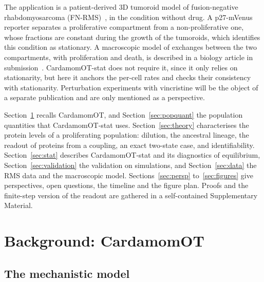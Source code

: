 \documentclass[a4paper, 11pt]{article}
\theoremstyle{plain}
\theoremstyle{remark}
\begin{document}
The application is a patient-derived 3D tumoroid model of fusion-negative rhabdomyosarcoma (FN-RMS)~\cite{savary2023fnrms}, in the condition without drug. A p27-mVenus reporter separates a proliferative compartment from a non-proliferative one, whose fractions are constant during the growth of the tumoroids, which identifies this condition as stationary. A macroscopic model of exchanges between the two compartments, with proliferation and death, is described in a biology article in submission~\cite{rmsbio}. CardamomOT-stat does not require it, since it only relies on stationarity, but here it anchors the per-cell rates and checks their consistency with stationarity. Perturbation experiments with vincristine will be the object of a separate publication and are only mentioned as a perspective.

Section~\ref{sec:background} recalls CardamomOT, and Section~\ref{sec:popquant} the population quantities that CardamomOT-stat uses. Section~\ref{sec:theory} characterises the protein levels of a proliferating population: dilution, the ancestral lineage, the readout of proteins from a coupling, an exact two-state case, and identifiability. Section~\ref{sec:stat} describes CardamomOT-stat and its diagnostics of equilibrium, Section~\ref{sec:validation} the validation on simulations, and Section~\ref{sec:data} the RMS data and the macroscopic model. Sections~\ref{sec:persp} to~\ref{sec:figures} give perspectives, open questions, the timeline and the figure plan. Proofs and the finite-step version of the readout are gathered in a self-contained Supplementary Material.

\section{Background: CardamomOT}\label{sec:background}

\subsection{The mechanistic model}
\end{document}

